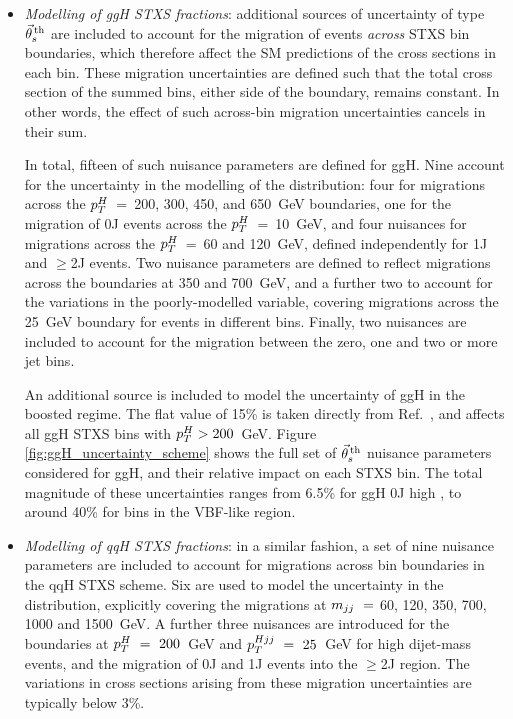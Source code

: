 \begin{itemize}
    \item \textit{Modelling of ggH STXS fractions}: additional sources of uncertainty of type $\vec{\theta}^{\,\rm{th}}_{s}$ are included to account for the migration of events \textit{across} STXS bin boundaries, which therefore affect the SM predictions of the cross sections in each bin. These migration uncertainties are defined such that the total cross section of the summed bins, either side of the boundary, remains constant. In other words, the effect of such across-bin migration uncertainties cancels in their sum.
    
    \noindent
    In total, fifteen of such nuisance parameters are defined for ggH. Nine account for the uncertainty in the modelling of the \ptH distribution: four for migrations across the $p_T^H$~=~200, 300, 450, and 650~GeV boundaries, one for the migration of 0J events across the $p_T^H$~=~10~GeV, and four nuisances for migrations across the $p_T^H$~=~60 and 120~GeV, defined independently for 1J and $\geq$2J events. Two nuisance parameters are defined to reflect migrations across the \mjj boundaries at 350 and 700~GeV, and a further two to account for the variations in the poorly-modelled \ptHjj variable, covering migrations across the 25~GeV boundary for events in different \mjj bins. Finally, two nuisances are included to account for the migration between the zero, one and two or more jet bins. 
    
    \noindent
    An additional source is included to model the uncertainty of ggH in the boosted regime. The flat value of 15\% is taken directly from Ref.~\cite{Becker:2020rjp}, and affects all ggH STXS bins with $p_T^H>200$~GeV. Figure \ref{fig:ggH_uncertainty_scheme} shows the full set of $\vec{\theta}^{\,\rm{th}}_{s}$ nuisance parameters considered for ggH, and their relative impact on each STXS bin. The total magnitude of these uncertainties ranges from 6.5\% for ggH 0J high \ptH, to around 40\% for bins in the VBF-like region.
    
    \item \textit{Modelling of qqH STXS fractions}: in a similar fashion, a set of nine nuisance parameters are included to account for migrations across bin boundaries in the qqH STXS scheme. Six are used to model the uncertainty in the \mjj distribution, explicitly covering the migrations at $m_{jj}~=~$60, 120, 350, 700, 1000 and 1500~GeV. A further three nuisances are introduced for the boundaries at $p_T^H~=~200$~GeV and $p_T^{Hjj}~=~25$~GeV for high dijet-mass events, and the migration of 0J and 1J events into the $\geq$2J region. The variations in cross sections arising from these migration uncertainties are typically below 3\%.
    

\end{itemize}
